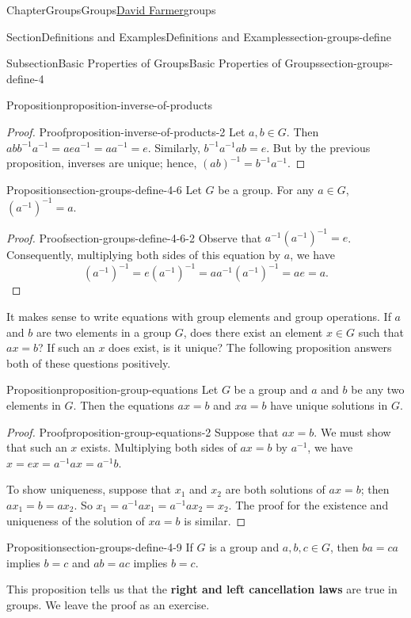\documentclass[oneside,10pt,]{book}
\newcommand{\terminology}[1]{\textbf{#1}}
\numberwithin{equation}{section}
\begin{document}
\begin{chapterptx}{Chapter}{Groups}{}{Groups}{\hyperlink{dfarmer}{David Farmer}}{}{groups}
\begin{sectionptx}{Section}{Definitions and Examples}{}{Definitions and Examples}{}{}{section-groups-define}
\begin{subsectionptx}{Subsection}{Basic Properties of Groups}{}{Basic Properties of Groups}{}{}{section-groups-define-4}
\begin{proposition}{Proposition}{}{}{proposition-inverse-of-products}
\end{proposition}
\begin{proof}{Proof}{}{proposition-inverse-of-products-2}
Let \(a, b \in G\). Then \(abb^{-1}a^{-1} = aea^{-1} = aa^{-1} = e\). Similarly, \(b^{-1}a^{-1}ab = e\). But by the previous proposition, inverses are unique; hence, \((ab)^{-1} = b^{-1}a^{-1}\).%
\end{proof}
\begin{proposition}{Proposition}{}{}{section-groups-define-4-6}%
Let \(G\) be a group.  For any \(a \in G\), \((a^{-1})^{-1} = a\).%
\end{proposition}
\begin{proof}{Proof}{}{section-groups-define-4-6-2}
Observe that \(a^{-1} (a^{-1})^{-1} = e\). Consequently, multiplying both sides of this equation by \(a\), we have%
\begin{equation*}
(a^{-1})^{-1} = e (a^{-1})^{-1} = a a^{-1} (a^{-1})^{-1} = ae = a\text{.}
\end{equation*}
%
\end{proof}
It makes sense to write equations with group elements and group operations. If \(a\) and \(b\) are two elements in a group \(G\), does there exist an element \(x \in G\) such that \(ax = b\)? If such an \(x\) does exist, is it unique? The following proposition answers both of these questions positively.%
\begin{proposition}{Proposition}{}{}{proposition-group-equations}%
Let \(G\) be a group and \(a\) and \(b\) be any two elements in \(G\). Then the equations \(ax = b\) and \(xa = b\) have unique solutions in \(G\).%
\end{proposition}
\begin{proof}{Proof}{}{proposition-group-equations-2}
Suppose that \(ax = b\). We must show that such an \(x\) exists. Multiplying both sides of \(ax = b\) by \(a^{-1}\), we have \(x = ex = a^{-1}ax = a^{-1}b\).%
\par
To show uniqueness, suppose that \(x_1\) and \(x_2\) are both solutions of \(ax = b\); then \(ax_1 = b = ax_2\). So \(x_1 = a^{-1}ax_1 = a^{-1}ax_2 = x_2\). The proof for the existence and uniqueness of the solution of \(xa = b\) is similar.%
\end{proof}
\begin{proposition}{Proposition}{}{}{section-groups-define-4-9}%
If \(G\) is a group and \(a, b, c \in G\), then \(ba = ca\) implies \(b = c\) and \(ab = ac\) implies \(b = c\).%
\end{proposition}
This proposition tells us that the \terminology{right and  left cancellation laws} are true in groups.  We leave the proof as an exercise.%

\end{subsectionptx}
\end{sectionptx}
\end{chapterptx}
\end{document}
